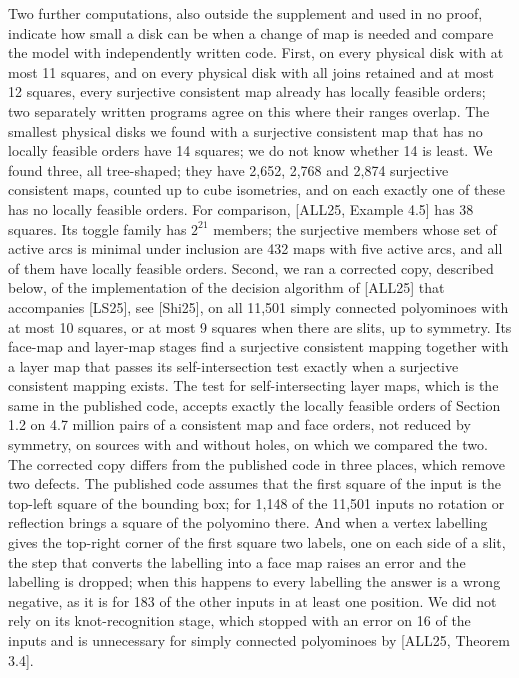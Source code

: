 \documentclass[
  11pt,
]{article}
\begin{document}
Two further computations, also outside the supplement and used in no
proof, indicate how small a disk can be when a change of map is needed
and compare the model with independently written code. First, on every
physical disk with at most 11 squares, and on every physical disk with
all joins retained and at most 12 squares, every surjective consistent
map already has locally feasible orders; two separately written programs
agree on this where their ranges overlap. The smallest physical disks we
found with a surjective consistent map that has no locally feasible
orders have 14 squares; we do not know whether 14 is least. We found
three, all tree-shaped; they have 2,652, 2,768 and 2,874 surjective
consistent maps, counted up to cube isometries, and on each exactly one
of these has no locally feasible orders. For comparison, {[}ALL25,
Example 4.5{]} has 38 squares. Its toggle family has \(2^{21}\) members;
the surjective members whose set of active arcs is minimal under
inclusion are 432 maps with five active arcs, and all of them have
locally feasible orders. Second, we ran a corrected copy, described
below, of the implementation of the decision algorithm of {[}ALL25{]}
that accompanies {[}LS25{]}, see {[}Shi25{]}, on all 11,501 simply
connected polyominoes with at most 10 squares, or at most 9 squares when
there are slits, up to symmetry. Its face-map and layer-map stages find
a surjective consistent mapping together with a layer map that passes
its self-intersection test exactly when a surjective consistent mapping
exists. The test for self-intersecting layer maps, which is the same in
the published code, accepts exactly the locally feasible orders of
Section 1.2 on 4.7 million pairs of a consistent map and face orders,
not reduced by symmetry, on sources with and without holes, on which we
compared the two. The corrected copy differs from the published code in
three places, which remove two defects. The published code assumes that
the first square of the input is the top-left square of the bounding
box; for 1,148 of the 11,501 inputs no rotation or reflection brings a
square of the polyomino there. And when a vertex labelling gives the
top-right corner of the first square two labels, one on each side of a
slit, the step that converts the labelling into a face map raises an
error and the labelling is dropped; when this happens to every labelling
the answer is a wrong negative, as it is for 183 of the other inputs in
at least one position. We did not rely on its knot-recognition stage,
which stopped with an error on 16 of the inputs and is unnecessary for
simply connected polyominoes by {[}ALL25, Theorem 3.4{]}.
\end{document}

